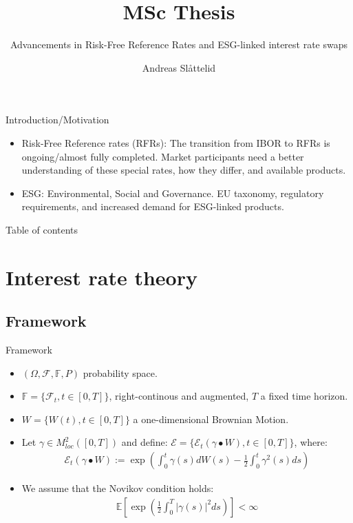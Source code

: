 \documentclass[UKenglish]{beamer}
\author{Andreas Slåttelid}
\title{MSc Thesis}
\subtitle{Advancements in Risk-Free Reference Rates and ESG-linked interest rate swaps}
\newcommand{\E}{\mathbb{E}}  %
\newcommand{\F}{\mathcal{F}} %
\begin{document}


%
%
\begin{frame}{Introduction/Motivation}
\begin{itemize}
    \item Risk-Free Reference rates (RFRs):
    The transition from IBOR to RFRs is ongoing/almost fully completed. Market participants need a better understanding of these special rates, how they differ, and available products. 
    \item ESG: Environmental, Social and Governance. EU taxonomy, regulatory requirements, and increased demand for ESG-linked products. 
    
\end{itemize} 
\end{frame}

\begin{frame}{Table of contents}
    \tableofcontents[currentsection]
\end{frame}



\section{Interest rate theory}
\SectionPage
\subsection{Framework}

\begin{frame}{Framework}
\begin{itemize}
    \item $(\Omega, \F, \mathbb{F}, P)$ probability space.  
    \item $\mathbb{F} = \{\F_{t}, t \in [0,T]\}$, right-continous and augmented, $T$ a fixed time horizon. 
    \item $W = \{W(t), t\in [0,T]\}$ a one-dimensional Brownian Motion. 
    \item Let $\gamma \in M^{2}_{loc}([0,T])$ and define:
    $\mathcal{E} = \{\mathcal{E}_{t}(\gamma \bullet W), t \in [0,T]\}$, where:
    \begin{align*}
     \mathcal{E}_{t}(\gamma \bullet W) := \exp\left(
     \int_{0}^{t}\gamma(s)dW(s) -\frac{1}{2}\int_{0}^{t}\gamma^{2}(s)ds
     \right)   
    \end{align*}
    \item We assume that the Novikov condition holds:
    \begin{align*}
     \E\left[
     \exp\left(
     \frac{1}{2}\int_{0}^{T}|\gamma(s)|^{2}ds
     \right)
     \right] < \infty   
    \end{align*}
\end{itemize}
\end{frame}
\end{document}
